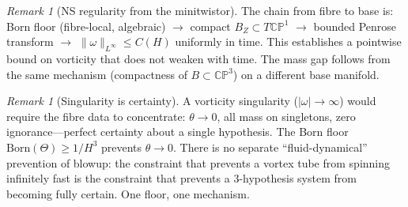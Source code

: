\documentclass[11pt,a4paper]{article}
\theoremstyle{definition}
\theoremstyle{remark}
\newtheorem{remark}[theorem]{Remark}
\newcommand{\CP}{\mathbb{CP}}
\begin{document}
\begin{remark}[NS regularity from the minitwistor]
The chain from fibre to base is: Born floor (fibre-local, algebraic) $\to$ compact $B_Z\subset T\CP^1$ $\to$ bounded Penrose transform $\to$ $\|\omega\|_{L^\infty}\leq C(H)$ uniformly in time. This establishes a pointwise bound on vorticity that does not weaken with time. The mass gap follows from the same mechanism (compactness of $B\subset\CP^3$) on a different base manifold.
\end{remark}

\begin{remark}[Singularity is certainty]\label{rem:singularity_certainty}
A vorticity singularity ($|\omega|\to\infty$) would require the fibre data to concentrate: $\theta\to 0$, all mass on singletons, zero ignorance---perfect certainty about a single hypothesis. The Born floor $\mathrm{Born}(\Theta)\geq 1/H^3$ prevents $\theta\to 0$. There is no separate ``fluid-dynamical'' prevention of blowup: the constraint that prevents a vortex tube from spinning infinitely fast is the constraint that prevents a $3$-hypothesis system from becoming fully certain. One floor, one mechanism.
\end{remark}
\end{document}
